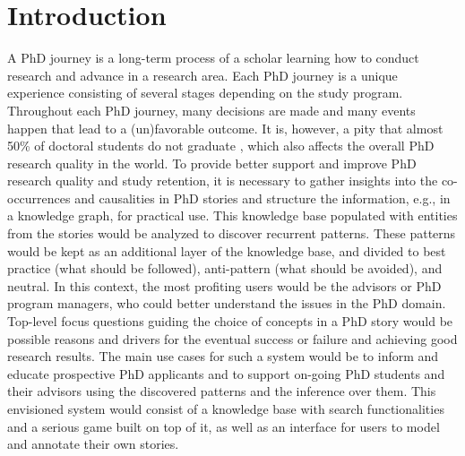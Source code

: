 \documentclass[sigconf]{acmart}
\begin{document}
\section{Introduction}
A PhD journey is a long-term process
of a scholar learning how to conduct research and advance in a research area.
Each PhD journey is a unique experience consisting of several %
stages depending on the study program. Throughout each PhD journey, many decisions are made and many events happen that lead to a (un)favorable outcome. It is, however, a pity that almost 50\% of doctoral students do not graduate \cite{councilofgraduateschools}, which also affects the overall PhD research quality in the world. To provide better support and improve %
PhD research quality and study retention, it is necessary to gather insights into the co-occurrences and causalities in PhD stories and structure the information, e.g., in a knowledge graph, for practical use. This knowledge base populated with entities from the stories would be analyzed to discover recurrent patterns. These patterns would be kept as an additional layer of the knowledge base, and divided to best practice (what should be followed), anti-pattern (what should be avoided), and neutral. In this context, the most profiting users would be the advisors or PhD program managers, who could better understand the issues in the PhD domain. Top-level focus questions guiding the choice of concepts in a PhD story would be possible reasons and drivers for the eventual success or failure and achieving good research results. The main use cases for such a system would be to inform and educate prospective PhD applicants and to support on-going PhD students and their advisors using the discovered patterns and the inference over them. This envisioned system would consist of a knowledge base with search functionalities and a serious game built on top of it, as well as an interface for users to model and annotate their own stories.
\end{document}
